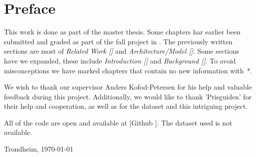 \section*{Preface}



\vspace{1cm}

This work is done as part of the master thesis. Some chapters har earlier been submitted and graded
as part of the fall project in \cite{Sivertsen2021}.
The previously written sections are most of
\textit{Related Work []} and \textit{Architecture/Model []}.
Some sections have we expanded, these include \textit{Introduction [] } and
\textit{Background []}.
To avoid misconceptions we have marked chapters that contain no new
information with \textit{*}.


We wish to thank our supervisor Anders Kofod-Petersen for his help and valuable feedback during this project.
Additionally, we would like to thank 'Prisguiden' for their help and cooperation,
as well as for the dataset and this intriguing project.

All of the code are open and available at [Github \cite{githubSource}]. The dataset used is not available.

\vfill

\hfill \thesisAuthor

\hfill Trondheim, \today